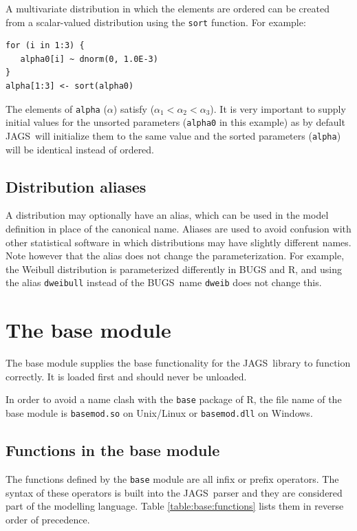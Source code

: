 \documentclass[11pt, a4paper, titlepage]{report}
\newcommand{\JAGS}{\textsf{JAGS}}
\newcommand{\BUGS}{\textsf{BUGS}}
\begin{document}
A multivariate distribution in which the elements are ordered can be
created from a scalar-valued distribution using the \texttt{sort}
function. For example:
\begin{verbatim}
for (i in 1:3) {
   alpha0[i] ~ dnorm(0, 1.0E-3)
}
alpha[1:3] <- sort(alpha0)
\end{verbatim}
The elements of \texttt{alpha} ($\alpha$) satisfy ($\alpha_1 <
\alpha_2 < \alpha_3$). It is very important to supply initial values
for the unsorted parameters (\texttt{alpha0} in this example) as by
default \JAGS\ will initialize them to the same value and the sorted
parameters (\texttt{alpha}) will be identical instead of ordered.

\section{Distribution aliases}

A distribution may optionally have an alias, which can be used in the
model definition in place of the canonical name. Aliases are used to
avoid confusion with other statistical software in which distributions
may have slightly different names. Note however that the alias does
not change the parameterization. For example, the Weibull distribution
is parameterized differently in BUGS and R, and using the alias
\texttt{dweibull} instead of the \BUGS\ name \texttt{dweib} does not
change this.

\chapter{The base module}

The base module supplies the base functionality for the \JAGS\ library
to function correctly. It is loaded first and should never be
unloaded.

In order to avoid a name clash with the \texttt{base} package of R,
the file name of the base module is \texttt{basemod.so} on Unix/Linux
or \texttt{basemod.dll} on Windows.

\section{Functions in the base module}
\label{section:base:functions}

The functions defined by the \texttt{base} module are all infix or
prefix operators. The syntax of these operators is built into the
\JAGS\ parser and they are considered part of the modelling language.
Table \ref{table:base:functions} lists them in reverse order of
precedence.
\end{document}
